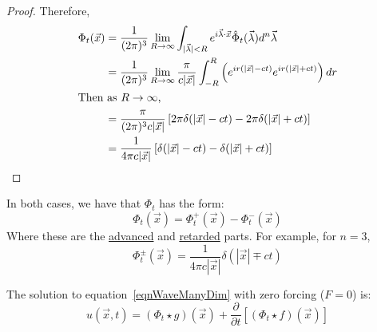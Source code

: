 \documentclass[../Main.tex]{subfiles}
\begin{document}
\begin{proof}
    Therefore,
    \begin{align*}
        \Phi_t(\vec{x}) &= \frac{1}{(2\pi)^3} \lim_{R \to \infty} \int_{|\vec{\lambda}| < R} e^{i \vec{\lambda} \cdot \vec{x}} \hat{\Phi}_t(\vec{\lambda}) d^n \vec{\lambda} \\
        &= \frac{1}{(2\pi)^3} \lim_{R \to \infty}\frac{\pi}{c|\vec{x}|} \int_{-R}^{R} \left(e^{ir(|\vec{x}| - ct)} e^{ir(|\vec{x}| + ct)}\right) dr  \\
        \intertext{Then as $R \to \infty$,}
        &= \frac{\pi}{(2\pi)^3c|\vec{x}|} \left[2\pi \delta(|\vec{x}| - ct) - 2\pi \delta(|\vec{x}| + ct)\right] \\
        &= \frac{1}{4\pi c|\vec{x}|} \left[\delta(|\vec{x}| - ct) - \delta(|\vec{x}| + ct)\right]
    \end{align*}
\end{proof}
In both cases, we have that $\Phi_t$ has the form:
\begin{equation*}
    \Phi_t(\vec{x}) = \Phi_t^+(\vec{x}) - \Phi_t^-(\vec{x})
\end{equation*}
Where these are the \underline{advanced} and \underline{retarded} parts. For example, for $n = 3$,
\begin{equation*}
    \Phi_t^\pm(\vec{x}) = \frac1{4\pi c|\vec{x}|} \delta(|\vec{x}| \mp ct)
\end{equation*}
\begin{proposition}
    The solution to equation~\ref{eqnWaveManyDim} with zero forcing ($F = 0$) is:
    \begin{equation}
        u(\vec{x}, t) = (\Phi_t \star g)(\vec{x}) + \frac{\partial}{\partial t} \left[(\Phi_t \star f)(\vec{x})\right]
        \label{eqnWaveSolutionZeroForce}
    \end{equation}
    \label{propWaveSolutionZeroForce}
\end{proposition}
\end{document}

